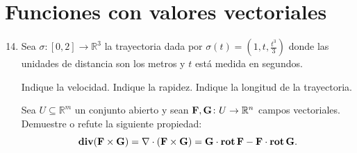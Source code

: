 \documentclass{fmbvecto}
\begin{document}
\section{Funciones con valores vectoriales}

\begin{enumerate}
    \setcounter{enumi}{13}
    \item Sea \(\sigma\colon [0,2] \to \mathbb{R}^{3}\) la trayectoria dada por \(\sigma (t) = \left(1,t,\frac{t^3}{3}\right)\) donde las unidades de distancia son los metros y \(t\) está medida en segundos.
    \begin{enumerate}
        \itemp[\(0.\bar{1}\)] Indique la velocidad.
        \itemp[\(0.\bar{1}\)] Indique la rapidez.
         \itemp[\(0.\bar{1}\)] Indique la longitud de la trayectoria.
    \end{enumerate}
    \itemp[\(0.\bar{3}\)] Sea \(U \subseteq \mathbb{R}^{m}\) un conjunto abierto y sean \(\boldsymbol{{\mathbf{F}}},\boldsymbol{{\mathbf{G}}}\colon U\to \mathbb{R}^{n}\) campos vectoriales. Demuestre o refute la siguiente propiedad:
\[\operatorname{\mathbf{div}} (\boldsymbol{{\mathbf{F}}} \times \boldsymbol{{\mathbf{G}}}) = \nabla \cdot (\boldsymbol{{\mathbf{F}}} \times \boldsymbol{{\mathbf{G}}}) = \boldsymbol{{\mathbf{G}}}\cdot \operatorname{\mathbf{rot}}\boldsymbol{{\mathbf{F}}} - \boldsymbol{{\mathbf{F}}}\cdot \operatorname{\mathbf{rot}} \boldsymbol{{\mathbf{G}}}.\]
\end{enumerate}
\end{document}
